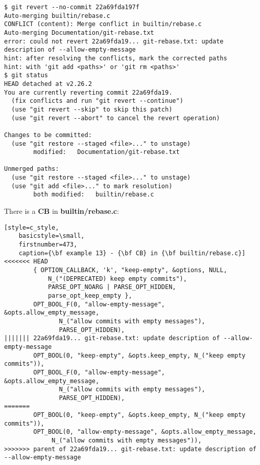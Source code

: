 \begin{lstlisting}[style=console_style,
	basicstyle=\small,
	caption={\bf example 13} - Reverting]
$ git revert --no-commit 22a69fda197f
Auto-merging builtin/rebase.c
CONFLICT (content): Merge conflict in builtin/rebase.c
Auto-merging Documentation/git-rebase.txt
error: could not revert 22a69fda19... git-rebase.txt: update description of --allow-empty-message
hint: after resolving the conflicts, mark the corrected paths
hint: with 'git add <paths>' or 'git rm <paths>'
$ git status
HEAD detached at v2.26.2
You are currently reverting commit 22a69fda19.
  (fix conflicts and run "git revert --continue")
  (use "git revert --skip" to skip this patch)
  (use "git revert --abort" to cancel the revert operation)

Changes to be committed:
  (use "git restore --staged <file>..." to unstage)
        modified:   Documentation/git-rebase.txt

Unmerged paths:
  (use "git restore --staged <file>..." to unstage)
  (use "git add <file>..." to mark resolution)
        both modified:   builtin/rebase.c
\end{lstlisting}

There is a {\bf CB} in {\bf builtin/rebase.c}:
\begin{lstlisting}[style=c_style,
	basicstyle=\small,
	firstnumber=473,
	caption={\bf example 13} - {\bf CB} in {\bf builtin/rebase.c}]
<<<<<<< HEAD
		{ OPTION_CALLBACK, 'k', "keep-empty", &options, NULL,
			N_("(DEPRECATED) keep empty commits"),
			PARSE_OPT_NOARG | PARSE_OPT_HIDDEN,
			parse_opt_keep_empty },
		OPT_BOOL_F(0, "allow-empty-message", &opts.allow_empty_message,
			   N_("allow commits with empty messages"),
			   PARSE_OPT_HIDDEN),
||||||| 22a69fda19... git-rebase.txt: update description of --allow-empty-message
		OPT_BOOL(0, "keep-empty", &opts.keep_empty, N_("keep empty commits")),
		OPT_BOOL_F(0, "allow-empty-message", &opts.allow_empty_message,
			   N_("allow commits with empty messages"),
			   PARSE_OPT_HIDDEN),
=======
		OPT_BOOL(0, "keep-empty", &opts.keep_empty, N_("keep empty commits")),
		OPT_BOOL(0, "allow-empty-message", &opts.allow_empty_message,
			 N_("allow commits with empty messages")),
>>>>>>> parent of 22a69fda19... git-rebase.txt: update description of --allow-empty-message
\end{lstlisting}

